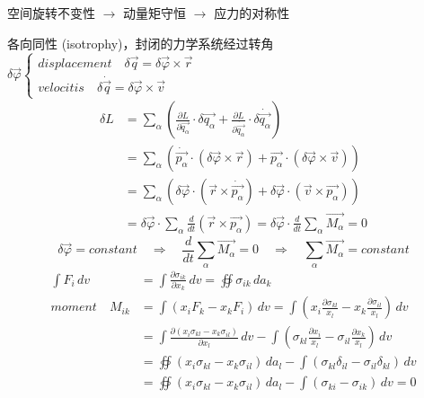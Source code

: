 \documentclass[12pt, a4paper, oneside, UTF8]{ctexbook}  %
\newcommand{\pa}{\partial}
\begin{document}
\begin{thm}
    空间旋转不变性 $\rightarrow$ 动量矩守恒 $\rightarrow$ 应力的对称性
    
    各向同性 (isotrophy)，封闭的力学系统经过转角\(\delta\vec{\varphi}
    \begin{cases}
        displacement\quad \delta\vec{q}=\delta\vec{\varphi}\times\vec{r}\\
        velocitis\quad \delta\dot{\vec{q}}=\delta\vec{\varphi}\times\vec{v}
    \end{cases}\)
    \begin{align*}
        \delta L&=\sum_{\alpha}\left(\frac{\pa L}{\pa\vec{q_\alpha}}\cdot\delta\vec{q_\alpha}
        +\frac{\pa L}{\pa\dot{\vec{q_\alpha}}}\cdot\delta\dot{\vec{q_\alpha}}\right)\\
        &=\sum_{\alpha}\left(\dot{\vec{p_\alpha}}\cdot(\delta\vec{\varphi}\times\vec{r})
        +\vec{p_\alpha}\cdot(\delta\vec{\varphi}\times\vec{v})\right)\\
        &=\sum_{\alpha}\left(\delta\vec{\varphi}\cdot(\vec{r}\times\dot{\vec{p_\alpha}})
        +\delta\vec{\varphi}\cdot(\vec{v}\times\vec{p_\alpha})\right)\\
        &=\delta\vec{\varphi}\cdot\sum_{\alpha}\frac{d}{dt}(\vec{r}\times\vec{p_\alpha})
        =\delta\vec{\varphi}\cdot\frac{d}{dt}\sum_{\alpha}\vec{M_\alpha}=0
    \end{align*}
    \[\delta\vec{\varphi}=constant\quad\Rightarrow\quad \frac{d}{dt}\sum_{\alpha}\vec{M_\alpha}=0
    \quad\Rightarrow\quad\sum_{\alpha}\vec{M_\alpha}=constant\]
    \begin{align*}
        \int F_i\,dv&=\int \frac{\pa \sigma_{ik}}{\pa x_k}\,dv=\oiint \sigma_{ik}\,da_k\\
        moment\quad M_{ik}&=\int (x_iF_k-x_kF_i)\,dv=\int\left(x_i\frac{\pa \sigma_{kl}}{x_l}-x_k\frac{\pa \sigma_{il}}{x_l}\right)\,dv\\
        &=\int\frac{\pa (x_i\sigma_{kl}-x_k\sigma_{il})}{\pa x_l}\,dv
        -\int\left(\sigma_{kl}\frac{\pa x_i}{x_l}-\sigma_{il}\frac{\pa x_k}{x_l}\right)\,dv\\
        &=\oiint (x_i\sigma_{kl}-x_k\sigma_{il})\,da_l 
        -\int(\sigma_{kl}\delta_{il}-\sigma_{il}\delta_{kl})\,dv\\
        &=\oiint (x_i\sigma_{kl}-x_k\sigma_{il})\,da_l 
        -\int(\sigma_{ki}-\sigma_{ik})\,dv=0
    \end{align*}
\end{thm}
\end{document}
